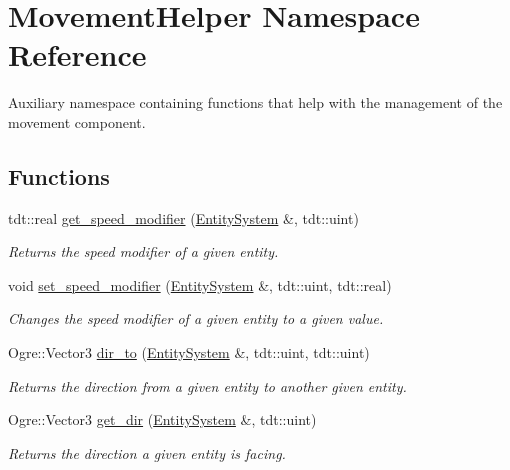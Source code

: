 \hypertarget{namespace_movement_helper}{}\section{Movement\+Helper Namespace Reference}
\label{namespace_movement_helper}


Auxiliary namespace containing functions that help with the management of the movement component.  


\subsection*{Functions}
\begin{DoxyCompactItemize}
\item 
tdt\+::real \hyperlink{namespace_movement_helper_a78caca6696da7c8469be594c10566efe}{get\+\_\+speed\+\_\+modifier} (\hyperlink{class_entity_system}{Entity\+System} \&, tdt\+::uint)
\begin{DoxyCompactList}\small\item\em Returns the speed modifier of a given entity. \end{DoxyCompactList}\item 
void \hyperlink{namespace_movement_helper_aa8e68ccec1414da99fbe633167c825f5}{set\+\_\+speed\+\_\+modifier} (\hyperlink{class_entity_system}{Entity\+System} \&, tdt\+::uint, tdt\+::real)
\begin{DoxyCompactList}\small\item\em Changes the speed modifier of a given entity to a given value. \end{DoxyCompactList}\item 
Ogre\+::\+Vector3 \hyperlink{namespace_movement_helper_ac54475c4d0d6bcba6439b1ebd865dd26}{dir\+\_\+to} (\hyperlink{class_entity_system}{Entity\+System} \&, tdt\+::uint, tdt\+::uint)
\begin{DoxyCompactList}\small\item\em Returns the direction from a given entity to another given entity. \end{DoxyCompactList}\item 
Ogre\+::\+Vector3 \hyperlink{namespace_movement_helper_a9ede25ceb75fc35bce47b0341d6cf949}{get\+\_\+dir} (\hyperlink{class_entity_system}{Entity\+System} \&, tdt\+::uint)
\begin{DoxyCompactList}\small\item\em Returns the direction a given entity is facing. \end{DoxyCompactList}\item 

\end{DoxyCompactItemize}
